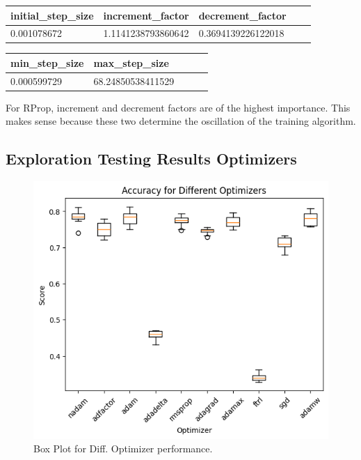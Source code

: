 \documentclass[conference]{IEEEtran}
\begin{document}
\begin{table}[!ht]
    \centering
    \begin{tabular}{|l|l|l|l|l|}
    \hline
        initial\_step\_size & increment\_factor & decrement\_factor \\ \hline
        0.001078672 & 1.1141238793860642 & 0.3694139226122018 \\ \hline
    \end{tabular}
\end{table}

\begin{table}[!ht]
    \centering
    \begin{tabular}{|l|l|l|l|l|}
    \hline
        min\_step\_size & max\_step\_size \\ \hline
        0.000599729 & 68.24850538411529 \\ \hline
    \end{tabular}
\end{table}

For RProp, increment and decrement factors are of the highest importance. This makes sense because these two determine the oscillation of the training algorithm. 

\subsection{Exploration Testing Results Optimizers}

\begin{figure}[htbp]
\centerline{\includegraphics[width=\columnwidth]{Ex Optis Hyp Opt Res Box Acc.png}}
\caption{Box Plot for Diff. Optimizer performance.}
\label{fig}
\end{figure}
\end{document}
